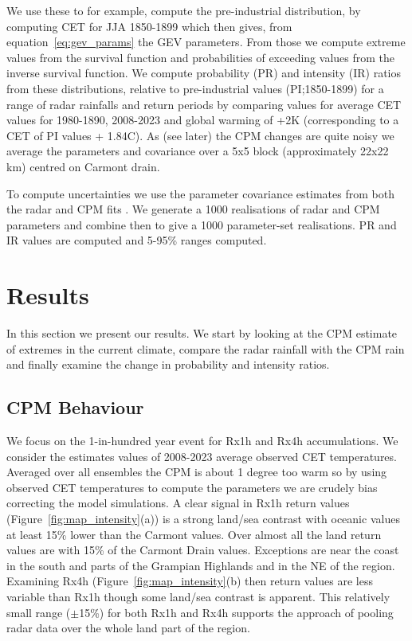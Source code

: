 \documentclass[11pt,a4paper]{article}
\begin{document}
We use these to for example, compute the pre-industrial distribution, by computing CET for JJA 1850-1899 which then gives, from equation~\ref{eq:gev_params} the GEV parameters. From those we compute  extreme values from the survival function and probabilities of exceeding values from the  inverse survival function. We compute probability (PR) and intensity (IR) ratios from these distributions, relative to pre-industrial values (PI;1850-1899) for a range of radar rainfalls and return periods by comparing values for average CET values for 1980-1890, 2008-2023 and global warming of +2K (corresponding to a CET of PI values + 1.84C\parencite{tett2023edinburgh}). As (see later) the CPM changes are quite noisy we average the parameters and covariance over a 5x5 block (approximately 22x22 km) centred on Carmont drain.

To compute uncertainties we use the parameter covariance  estimates from both the radar and CPM fits \parencite{gilleland2016extremes}. We generate a 1000 realisations of radar and CPM parameters and combine then to give a 1000 parameter-set realisations. PR and IR values are computed and 5-95\% ranges computed. 

\section{Results}

In this section we present our results. We start by looking at the CPM estimate of extremes in the current climate, compare the radar rainfall with the CPM rain and finally examine the change in probability and intensity ratios. 
\subsection{CPM Behaviour}
We focus on the 1-in-hundred year event for Rx1h and Rx4h accumulations.  We consider the estimates values of 2008-2023 average observed CET temperatures. Averaged over all ensembles the CPM is about 1 degree too warm so by using observed CET temperatures to compute the parameters we are crudely bias correcting the model simulations. A clear signal in Rx1h return values (Figure~\ref{fig:map_intensity}(a)) is a strong land/sea contrast with oceanic values at least 15\% lower than the Carmont values.  Over almost all the land return values are with 15\% of the Carmont Drain values. Exceptions are near the coast in the south and parts of the Grampian Highlands and in the NE of the region.  Examining Rx4h (Figure~\ref{fig:map_intensity}(b) then return values are less variable than Rx1h though some land/sea contrast is apparent.  This relatively small range ($\pm$15\%) for both Rx1h and Rx4h supports the approach of pooling radar data over the whole land part of the region. 
\end{document}
